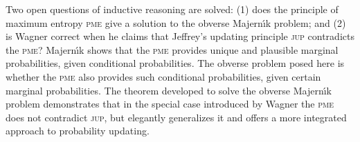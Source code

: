 Two open questions of inductive reasoning are solved: (1) does the
principle of maximum entropy \textsc{pme} give a solution to the
obverse Majern{\'\i}k problem; and (2) is Wagner correct when he
claims that Jeffrey's updating principle \textsc{jup} contradicts the
\textsc{pme}?  Majern{\'\i}k shows that the \textsc{pme} provides
unique and plausible marginal probabilities, given conditional
probabilities.  The obverse problem posed here is whether the
\textsc{pme} also provides such conditional probabilities, given
certain marginal probabilities. The theorem developed to solve the
obverse Majern{\'\i}k problem demonstrates that in the special case
introduced by Wagner the \textsc{pme} does not contradict
\textsc{jup}, but elegantly generalizes it and offers a more
integrated approach to probability updating.
